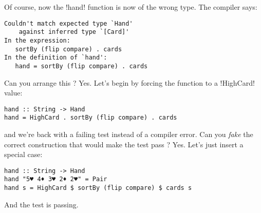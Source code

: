 \error Of course, now the \il!hand! function is now of the wrong type.
\lhN The compiler says:
\begin{small}
\begin{verbatim}
Couldn't match expected type `Hand' 
    against inferred type `[Card]'
In the expression: 
   sortBy (flip compare) . cards
In the definition of `hand': 
   hand = sortBy (flip compare) . cards
\end{verbatim}
\end{small}
Can you arrange this ?
\lhA Yes. Let's begin by forcing the function to a \il!HighCard! value:
\begin{lstlisting}[frame=single]
hand :: String -> Hand
hand = HighCard . sortBy (flip compare) . cards
\end{lstlisting}
\failure and we're back with a failing test instead of a compiler error.
\lhN Can you \emph{fake} the correct construction that would make the test pass ?
\lhA Yes. Let's just insert a special case:
\begin{lstlisting}[frame=single]
hand :: String -> Hand
hand "5♥ 4♦ 3♥ 2♦ 2♥" = Pair 
hand s = HighCard $ sortBy (flip compare) $ cards s
\end{lstlisting}
\success And the test is passing.
\lhend


